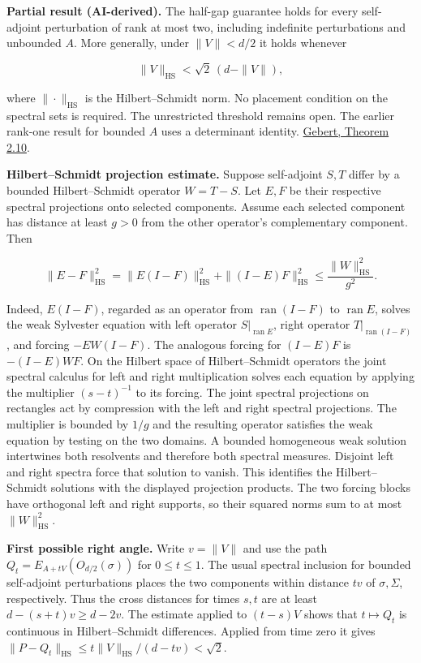 \documentclass[11pt,a4paper]{article}
\begin{document}
\textbf{Partial result (AI-derived).} The half-gap guarantee holds for
every self-adjoint perturbation of rank at most two, including
indefinite perturbations and unbounded \(A\). More generally, under
\(\|V\|< d/2\) it holds whenever

\[\|V\|_{\mathrm{HS}}<\sqrt{2}\,(d-\|V\|),\]

where \(\|\cdot\|_{\mathrm{HS}}\) is the Hilbert--Schmidt norm. No
placement condition on the spectral sets is required. The unrestricted
threshold remains open. The earlier rank-one result for bounded \(A\)
uses a determinant identity.
\href{https://arxiv.org/abs/1705.02796}{Gebert, Theorem 2.10}.

\textbf{Hilbert--Schmidt projection estimate.} Suppose self-adjoint
\(S,T\) differ by a bounded Hilbert--Schmidt operator \(W=T-S\). Let
\(E,F\) be their respective spectral projections onto selected
components. Assume each selected component has distance at least \(g>0\)
from the other operator's complementary component. Then

\[\|E-F\|_{\mathrm{HS}}^2
=\|E(I-F)\|_{\mathrm{HS}}^2+\|(I-E)F\|_{\mathrm{HS}}^2
\le \frac{\|W\|_{\mathrm{HS}}^2}{g^2}.\]

Indeed, \(E(I-F)\), regarded as an operator from
\(\mathop{\mathrm{ran}}\nolimits(I-F)\) to
\(\mathop{\mathrm{ran}}\nolimits E\), solves the weak Sylvester equation
with left operator \(S|_{\mathop{\mathrm{ran}}\nolimits E}\), right
operator \(T|_{\mathop{\mathrm{ran}}\nolimits(I-F)}\), and forcing
\(-EW(I-F)\). The analogous forcing for \((I-E)F\) is \(-(I-E)WF\). On
the Hilbert space of Hilbert--Schmidt operators the joint spectral
calculus for left and right multiplication solves each equation by
applying the multiplier \((s-t)^{-1}\) to its forcing. The joint
spectral projections on rectangles act by compression with the left and
right spectral projections. The multiplier is bounded by \(1/g\) and the
resulting operator satisfies the weak equation by testing on the two
domains. A bounded homogeneous weak solution intertwines both resolvents
and therefore both spectral measures. Disjoint left and right spectra
force that solution to vanish. This identifies the Hilbert--Schmidt
solutions with the displayed projection products. The two forcing blocks
have orthogonal left and right supports, so their squared norms sum to
at most \(\|W\|_{\mathrm{HS}}^2\).

\textbf{First possible right angle.} Write \(v=\|V\|\) and use the path
\(Q_t=E_{A+tV}(O_{d/2}(\sigma))\) for \(0\le t\le1\). The usual spectral
inclusion for bounded self-adjoint perturbations places the two
components within distance \(tv\) of \(\sigma,\Sigma\), respectively.
Thus the cross distances for times \(s,t\) are at least
\(d-(s+t)v\ge d-2v\). The estimate applied to \((t-s)V\) shows that
\(t\mapsto Q_t\) is continuous in Hilbert--Schmidt differences. Applied
from time zero it gives
\(\|P-Q_t\|_{\mathrm{HS}}\le t\|V\|_{\mathrm{HS}}/(d-tv)<\sqrt2\).
\end{document}
